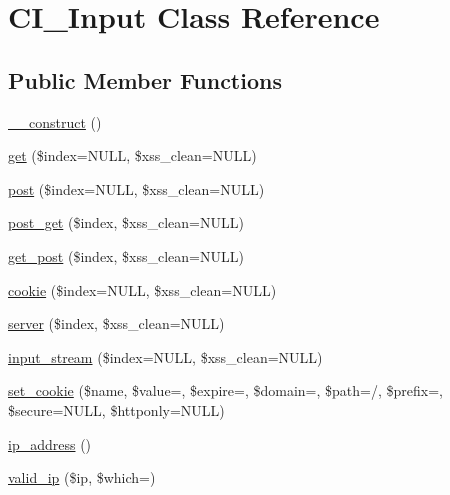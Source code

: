 \hypertarget{class_c_i___input}{}\section{C\+I\+\_\+\+Input Class Reference}
\label{class_c_i___input}
\subsection*{Public Member Functions}
\begin{DoxyCompactItemize}
\item 
\mbox{\hyperlink{class_c_i___input_a095c5d389db211932136b53f25f39685}{\+\_\+\+\_\+construct}} ()
\item 
\mbox{\hyperlink{class_c_i___input_a970536cd64a3d4457502140cce03fb05}{get}} (\$index=N\+U\+LL, \$xss\+\_\+clean=N\+U\+LL)
\item 
\mbox{\hyperlink{class_c_i___input_abe57ddea9c16f0d9194c82c700c0416f}{post}} (\$index=N\+U\+LL, \$xss\+\_\+clean=N\+U\+LL)
\item 
\mbox{\hyperlink{class_c_i___input_a3c554376c4a437c5363a143d1ca88ecc}{post\+\_\+get}} (\$index, \$xss\+\_\+clean=N\+U\+LL)
\item 
\mbox{\hyperlink{class_c_i___input_aaf7eba2dc5fda4e14ae063f66236821f}{get\+\_\+post}} (\$index, \$xss\+\_\+clean=N\+U\+LL)
\item 
\mbox{\hyperlink{class_c_i___input_a473ce915ac81faa466ca351dacae799d}{cookie}} (\$index=N\+U\+LL, \$xss\+\_\+clean=N\+U\+LL)
\item 
\mbox{\hyperlink{class_c_i___input_aab98211ca0db00061e8eb8b928f4fd90}{server}} (\$index, \$xss\+\_\+clean=N\+U\+LL)
\item 
\mbox{\hyperlink{class_c_i___input_a55235beafbbc257c5e511435a4d9ec81}{input\+\_\+stream}} (\$index=N\+U\+LL, \$xss\+\_\+clean=N\+U\+LL)
\item 
\mbox{\hyperlink{class_c_i___input_aa3601d205cabc35a3d1f56ed90024eda}{set\+\_\+cookie}} (\$name, \$value=\textquotesingle{}\textquotesingle{}, \$expire=\textquotesingle{}\textquotesingle{}, \$domain=\textquotesingle{}\textquotesingle{}, \$path=\textquotesingle{}/\textquotesingle{}, \$prefix=\textquotesingle{}\textquotesingle{}, \$secure=N\+U\+LL, \$httponly=N\+U\+LL)
\item 
\mbox{\hyperlink{class_c_i___input_aec2f772317b4fb79cc696412c2e455c3}{ip\+\_\+address}} ()
\item 
\mbox{\hyperlink{class_c_i___input_a10da42e1fde6cd5b335efcd2338c4ff8}{valid\+\_\+ip}} (\$ip, \$which=\textquotesingle{}\textquotesingle{})

\end{DoxyCompactItemize}
